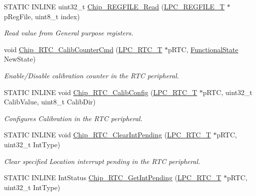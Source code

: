 \begin{DoxyCompactItemize}
S\+T\+A\+T\+I\+C I\+N\+L\+I\+N\+E uint32\+\_\+t \hyperlink{group___r_t_c__17_x_x__40_x_x_gafdad7b4e551aa7e6d52b49a7a072f4ae}{Chip\+\_\+\+R\+E\+G\+F\+I\+L\+E\+\_\+\+Read} (\hyperlink{struct_l_p_c___r_e_g_f_i_l_e___t}{L\+P\+C\+\_\+\+R\+E\+G\+F\+I\+L\+E\+\_\+\+T} $\ast$p\+Reg\+File, uint8\+\_\+t index)
\begin{DoxyCompactList}\small\item\em Read value from General purpose registers. \end{DoxyCompactList}\item 
void \hyperlink{group___r_t_c__17_x_x__40_x_x_ga987c9ab06dc2bb157388ddf9159de813}{Chip\+\_\+\+R\+T\+C\+\_\+\+Calib\+Counter\+Cmd} (\hyperlink{struct_l_p_c___r_t_c___t}{L\+P\+C\+\_\+\+R\+T\+C\+\_\+\+T} $\ast$p\+R\+T\+C, \hyperlink{group___l_p_c___types___public___types_gac9a7e9a35d2513ec15c3b537aaa4fba1}{Functional\+State} New\+State)
\begin{DoxyCompactList}\small\item\em Enable/\+Disable calibration counter in the R\+T\+C peripheral. \end{DoxyCompactList}\item 
S\+T\+A\+T\+I\+C I\+N\+L\+I\+N\+E void \hyperlink{group___r_t_c__17_x_x__40_x_x_ga4f0a93e9a72f793b5891e2d691a1d35d}{Chip\+\_\+\+R\+T\+C\+\_\+\+Calib\+Config} (\hyperlink{struct_l_p_c___r_t_c___t}{L\+P\+C\+\_\+\+R\+T\+C\+\_\+\+T} $\ast$p\+R\+T\+C, uint32\+\_\+t Calib\+Value, uint8\+\_\+t Calib\+Dir)
\begin{DoxyCompactList}\small\item\em Configures Calibration in the R\+T\+C peripheral. \end{DoxyCompactList}\item 
S\+T\+A\+T\+I\+C I\+N\+L\+I\+N\+E void \hyperlink{group___r_t_c__17_x_x__40_x_x_gaa43865e87cf61d579a4ee52a307b3e30}{Chip\+\_\+\+R\+T\+C\+\_\+\+Clear\+Int\+Pending} (\hyperlink{struct_l_p_c___r_t_c___t}{L\+P\+C\+\_\+\+R\+T\+C\+\_\+\+T} $\ast$p\+R\+T\+C, uint32\+\_\+t Int\+Type)
\begin{DoxyCompactList}\small\item\em Clear specified Location interrupt pending in the R\+T\+C peripheral. \end{DoxyCompactList}\item 
S\+T\+A\+T\+I\+C I\+N\+L\+I\+N\+E Int\+Status \hyperlink{group___r_t_c__17_x_x__40_x_x_gaab21524984ac344d4f508d2dfd6c5098}{Chip\+\_\+\+R\+T\+C\+\_\+\+Get\+Int\+Pending} (\hyperlink{struct_l_p_c___r_t_c___t}{L\+P\+C\+\_\+\+R\+T\+C\+\_\+\+T} $\ast$p\+R\+T\+C, uint32\+\_\+t Int\+Type)

\end{DoxyCompactItemize}
